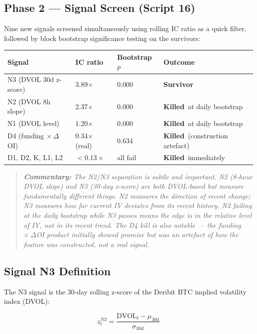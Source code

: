 \documentclass[11pt,a4paper]{article}
\newcommand{\Survivor}{\textcolor{passgreen}{\textbf{Survivor}}}
\newcommand{\Killed}{\textcolor{failred}{\textbf{Killed}}}
\newcommand{\comment}[1]{%
  \begin{quote}
    \small\itshape\textbf{Commentary:} #1
  \end{quote}
}
\begin{document}
\subsection{Phase 2 --- Signal Screen (Script 16)}

Nine new signals screened simultaneously using rolling IC ratio as a quick filter, followed by block bootstrap significance testing on the survivors:

\begin{center}
\begin{tabular}{@{}llll@{}}
\toprule
\textbf{Signal} & \textbf{IC ratio} & \textbf{Bootstrap $p$} & \textbf{Outcome} \\
\midrule
N3 (DVOL 30d z-score) & 3.89$\times$ & 0.000 & \Survivor \\
N2 (DVOL 8h slope) & 2.37$\times$ & 0.000 & \Killed\ at daily bootstrap \\
N1 (DVOL level) & 1.20$\times$ & 0.000 & \Killed\ at daily bootstrap \\
D4 (funding $\times\ \Delta$OI) & 0.34$\times$ (real) & 0.634 & \Killed\ (construction artefact) \\
D1, D2, K, L1, L2 & $< 0.13\times$ & all fail & \Killed\ immediately \\
\bottomrule
\end{tabular}
\end{center}

\comment{The N2/N3 separation is subtle and important. N2 (8-hour DVOL slope) and N3 (30-day z-score) are both DVOL-based but measure fundamentally different things. N2 measures the direction of recent change; N3 measures how far current IV deviates from its recent history. N2 failing at the daily bootstrap while N3 passes means the edge is in the \emph{relative level} of IV, not in its recent trend. The D4 kill is also notable --- the funding $\times\ \Delta$OI product initially showed promise but was an artefact of how the feature was constructed, not a real signal.}

\subsection{Signal N3 Definition}

The N3 signal is the 30-day rolling z-score of the Deribit BTC implied volatility index (DVOL):

\begin{equation}
z_t^{N3} = \frac{\mathrm{DVOL}_t - \mu_{30\mathrm{d}}}{\sigma_{30\mathrm{d}}}
\end{equation}
\end{document}
